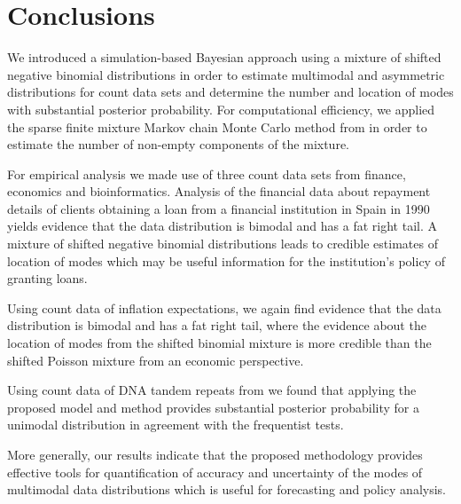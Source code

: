 \documentclass[11pt]{article}
\begin{document}
\section{Conclusions}
\label{sec:conclusion}

We introduced a simulation-based Bayesian approach using a mixture of shifted negative binomial distributions in order to estimate multimodal and asymmetric distributions for count data sets and 
determine the  number and location of modes with substantial posterior probability.
For computational efficiency, we applied the sparse finite mixture Markov chain Monte Carlo method  from \citet{Mal:SFS:2016} in order to estimate the number of non-empty components of the mixture.


For empirical analysis we made use of three count data sets from finance, economics and bioinformatics. Analysis of the financial data about  repayment details of clients obtaining a loan from a financial institution in Spain in 1990 yields evidence that the data distribution is bimodal and has a fat right tail. A mixture of shifted negative binomial distributions leads to credible estimates of location of modes which may be useful information for the institution's policy of granting loans.  



Using count data of inflation expectations, we again find evidence that the data distribution is bimodal and has a fat right tail, where the evidence about the location of modes from the shifted binomial mixture is more credible than the shifted Poisson mixture from an economic perspective. 

Using count data of DNA tandem repeats from \cite{DNA_leiden} we found that applying the proposed model and method provides substantial posterior probability for a unimodal distribution
in agreement with the frequentist tests. 

More generally, our results indicate that the proposed methodology provides effective tools for quantification of accuracy and uncertainty  of the modes of multimodal data distributions which is useful for forecasting and policy analysis.
\end{document}
